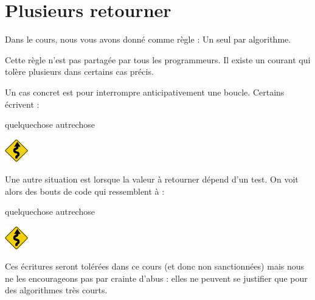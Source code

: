 \section{Plusieurs retourner}
	
	Dans le cours,
	nous vous avons donné comme règle :
	\og{}Un seul  par algorithme\fg{}.

	Cette règle n'est pas partagée par tous les programmeurs.
	Il existe un courant qui tolère plusieurs 
	dans certains cas précis.

	\begin{minipage}{7cm}
		Un cas concret est pour interrompre anticipativement une boucle.
		Certains écrivent :
	\end{minipage}
	\quad
	\begin{minipage}{6cm}
		\begin{LDA}
				\If{\dots}
					\Return quelquechose
				\EndIf
			\EndFor
			\Return autrechose
		\end{LDA}
	\end{minipage}
	\hskip-5mm
	\includegraphics[width=1cm]{icon/caution}
	
	\bigskip
	\begin{minipage}{7cm}
		Une autre situation est lorsque la valeur à retourner dépend d'un test.
		On voit alors des bouts de code qui ressemblent à :
	\end{minipage}
	\quad
	\begin{minipage}{6cm}
		\begin{LDA}
			\If{\dots}
				\Return quelquechose
			\Else
				\Return autrechose
			\EndIf
		\end{LDA}
	\end{minipage}
	\hskip-5mm
	\includegraphics[width=1cm]{icon/caution}
	
	Ces écritures seront tolérées dans ce cours
	(et donc non sanctionnées)
	mais nous ne les encourageons pas
	par crainte d'abus : elles ne peuvent se
	justifier que pour des algorithmes très courts.
	
